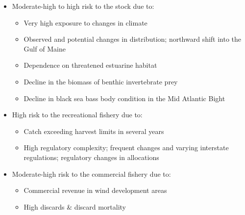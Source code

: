 \documentclass[
]{article}
\providecommand{\tightlist}{%
  \setlength{\itemsep}{0pt}\setlength{\parskip}{0pt}}
\begin{document}
\begin{itemize}
\tightlist
\item
  Moderate-high to high risk to the stock due to:

  \begin{itemize}
  \tightlist
  \item
    Very high exposure to changes in climate
  \item
    Observed and potential changes in distribution; northward shift into
    the Gulf of Maine
  \item
    Dependence on threatened estuarine habitat
  \item
    Decline in the biomass of benthic invertebrate prey
  \item
    Decline in black sea bass body condition in the Mid Atlantic Bight
  \end{itemize}
\item
  High risk to the recreational fishery due to:

  \begin{itemize}
  \tightlist
  \item
    Catch exceeding harvest limits in several years
  \item
    High regulatory complexity; frequent changes and varying interstate
    regulations; regulatory changes in allocations
  \end{itemize}
\item
  Moderate-high risk to the commercial fishery due to:

  \begin{itemize}
  \tightlist
  \item
    Commercial revenue in wind development areas
  \item
    High discards \& discard mortality
  \end{itemize}
\end{itemize}

\hfill
\end{document}
